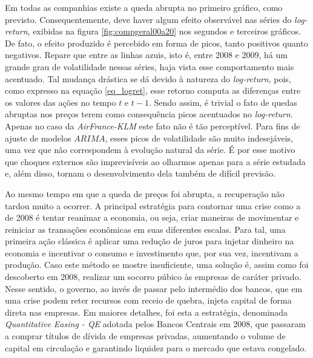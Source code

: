 \documentclass[12pt]{article}
\begin{document}
Em todas as companhias existe a queda abrupta no primeiro gráfico, como previsto. Consequentemente, deve haver algum efeito observável nas séries do \textit{log-return}, exibidas na figura \ref{fig:compgeral00a20} nos segundos e terceiros gráficos. De fato, o efeito produzido é percebido em forma de picos, tanto positivos quanto negativos. Repare que entre as linhas azuis, isto é, entre 2008 e 2009, há um grande grau de volatilidade nessas séries, haja vista esse comportamento mais acentuado. Tal mudança drástica se dá devido à natureza do \textit{log-return}, pois, como expresso na equação \ref{eq_logret}, esse retorno computa as diferenças entre os valores das ações no tempo $t$ e $t-1$. Sendo assim, é trivial o fato de quedas abruptas nos preços terem como consequência picos acentuados no \textit{log-return}. Apenas no caso da \textit{AirFrance-KLM} este fato não é tão perceptível. Para fins de ajuste de modelos $ARIMA$, esses picos de volatilidade são muito indesejáveis, uma vez que não correspondem à evolução natural da série. É por esse motivo que choques externos são imprevisíveis ao olharmos apenas para a série estudada e, além disso,  tornam o desenvolvimento dela também de difícil previsão. 

Ao mesmo tempo em que a queda de preços foi abrupta, a recuperação não tardou muito a ocorrer. A principal estratégia para contornar uma crise como a de 2008 é tentar reanimar a economia, ou seja, criar maneiras de movimentar e reiniciar as transações econômicas em suas diferentes escalas. Para tal, uma primeira ação clássica é aplicar uma redução de juros para injetar dinheiro na economia e incentivar o consumo e investimento que, por sua vez, incentivam a produção. Caso este método se mostre insuficiente, uma solução é, assim como foi descoberto em 2008, realizar um socorro púbico às empresas de caráter privado. Nesse sentido, o governo, ao invés de passar pelo intermédio dos bancos, que em uma crise podem reter recursos com receio de quebra, injeta capital de forma direta nas empresas. Em maiores detalhes, foi esta a estratégia, denominada \textit{Quantitative Easing - QE} adotada pelos Bancos Centrais em 2008, que passaram a comprar títulos de dívida de empresas privadas, aumentando o volume de capital em circulação e garantindo liquidez para o mercado que estava congelado. 
\end{document}
